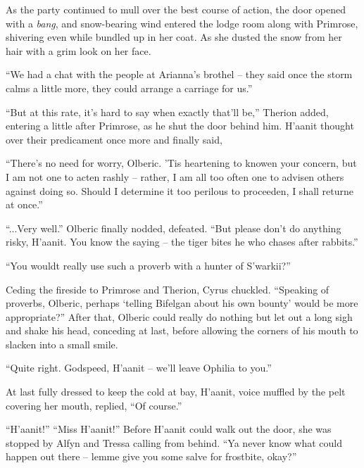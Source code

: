 As the party continued to mull over the best course of action, the door opened with a \emph{bang}, and snow-bearing wind entered the lodge room along with Primrose, shivering even while bundled up in her coat. As she dusted the snow from her hair with a grim look on her face.

``We had a chat with the people at Arianna's brothel -- they said once the storm calms a little more, they could arrange a carriage for us.''

``But at this rate, it's hard to say when exactly that'll be,'' Therion added, entering a little after Primrose, as he shut the door behind him. H'aanit thought over their predicament once more and finally said,

``There's no need for worry, Olberic. 'Tis heartening to knowen your concern, but I am not one to acten rashly -- rather, I am all too often one to advisen others against doing so. Should I determine it too perilous to proceeden, I shall returne at once.''

``...Very well.'' Olberic finally nodded, defeated. ``But please don't do anything risky, H'aanit. You know the saying -- the tiger bites he who chases after rabbits.'' 

``You wouldt really use such a proverb with a hunter of S'warkii?''

Ceding the fireside to Primrose and Therion, Cyrus chuckled. ``Speaking of proverbs, Olberic, perhaps `telling Bifelgan about his own bounty' would be more appropriate?'' After that, Olberic could really do nothing but let out a long sigh and shake his head, conceding at last, before allowing the corners of his mouth to slacken into a small smile.

``Quite right. Godspeed, H'aanit -- we'll leave Ophilia to you.''

At last fully dressed to keep the cold at bay, H'aanit, voice muffled by the pelt covering her mouth, replied, ``Of course.''

``H'aanit!'' ``Miss H'aanit!'' Before H'aanit could walk out the door, she was stopped by Alfyn and Tressa calling from behind. ``Ya never know what could happen out there -- lemme give you some salve for frostbite, okay?''

